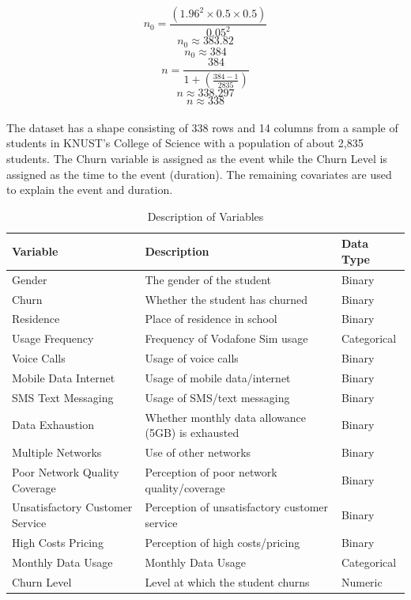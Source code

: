 \documentclass[doublespacing,12pt]{report}
\begin{document}
\begin{equation}
n_0 = \frac{\left(1.96^2 \times 0.5 \times 0.5\right)}{0.05^2}
\end{equation}
\begin{equation}
n_0 \approx 383.82
\end{equation}
\begin{equation}
n_0 \approx 384
\end{equation}
\begin{equation}
n = \frac{384}{1 + \left(\frac{384 - 1}{2835}\right)}
\end{equation}
\begin{equation}
n \approx 338.297
\end{equation}
\begin{equation}
n \approx 338
\end{equation}\\
The dataset has a shape consisting of 338 rows and 14 columns from a sample of students in KNUST's College of Science with a population of about 2,835 students. The Churn variable is assigned as the event while the Churn Level is assigned as the time to the event (duration). The remaining covariates are used to explain the event and duration.
\begin{table}[H]
    \centering
    \begin{tabularx}{\textwidth}{XXl}
        \toprule
        \textbf{Variable} & \textbf{Description} & \textbf{Data Type} \\
        \midrule
        Gender & The gender of the student & Binary \\
        Churn & Whether the student has churned & Binary \\
        Residence & Place of residence in school & Binary \\
        Usage Frequency & Frequency of Vodafone Sim usage & Categorical \\
        Voice Calls & Usage of voice calls & Binary \\
        Mobile Data Internet & Usage of mobile data/internet & Binary \\
        SMS Text Messaging & Usage of SMS/text messaging & Binary \\
        Data Exhaustion & Whether monthly data allowance (5GB) is exhausted & Binary \\
        Multiple Networks & Use of other networks & Binary \\
        Poor Network Quality Coverage & Perception of poor network quality/coverage & Binary \\
        Unsatisfactory Customer Service & Perception of unsatisfactory customer service & Binary \\
        High Costs Pricing & Perception of high costs/pricing & Binary \\
        Monthly Data Usage & Monthly Data Usage & Categorical \\
        Churn Level & Level at which the student churns & Numeric \\
        \bottomrule
    \end{tabularx}
    \caption{Description of Variables}
    \label{tab: 4.1}
\end{table}
\end{document}
